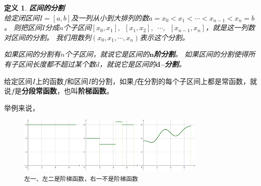 \documentclass[12pt,UTF8]{ctexbook}
\newtheorem{df}{定义}[section]
\begin{document}



\begin{df}{\textbf{区间的分割}}
    \mbox{} \\
    给定闭区间$I=[a, b]$及一列从小到大排列的数$a = x_0 < x_1 < \cdots < x_{n-1} < x_n = b$。
    则把区间$I$分成$n$个子区间$[x_0, x_1], \,\,\, [x_1, x_2], \,\,\,\cdots, \,\,\,[x_{n-1}, x_n]$，就是这一列数对区间的分割。
    我们用数列$(x_0, x_1, \cdots, x_n)$表示这个分割。

    如果区间的分割有$n$个子区间，就说它是区间的$\boldsymbol{n}$\textbf{阶分割}。
    如果区间的分割使得所有子区间长度都不超过某个数$d$，就说它是区间的$\boldsymbol{d}$\textbf{–分割}。

\end{df}

给定区间$I$上的函数$f$和区间$I$的分割，如果$f$在分割的每个子区间上都是常函数，就说$f$是\textbf{分段常函数}，也叫\textbf{阶梯函数}。

举例来说，

\begin{figure}[h] %
    \vspace{4pt}
    \centering
    \includegraphics[width=0.8\textwidth]{积分定义1.png} %
    \caption*{\texttt{左一、左二是阶梯函数，右一不是阶梯函数}}
\end{figure}
\end{document}
